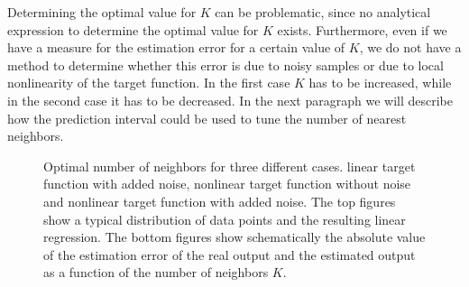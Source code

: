Determining the optimal value for $K$ can be problematic, since no analytical expression to determine the optimal value for $K$ exists. Furthermore, even if we have a measure for the estimation error for a certain value of $K$, we do not have a method to determine whether this error is due to noisy samples or due to local nonlinearity of the target function. In the first case $K$ has to be increased, while in the second case it has to be decreased. In the next paragraph we will describe how the prediction interval could be used to tune the number of nearest neighbors.

\begin{figure}[htbp]
\centering
{}
	\caption[Optimal number of neighbors for three different target functions]{Optimal number of neighbors for three different cases.  linear target function with added noise,  nonlinear target function without noise and  nonlinear target function with added noise. The top figures show a typical distribution of data points and the resulting linear regression. The bottom figures show schematically the absolute value of the estimation error of the real output and the estimated output as a function of the number of neighbors $K$.}
	\label{fig:LLR-optimal_K_schematic}
\end{figure}
	

